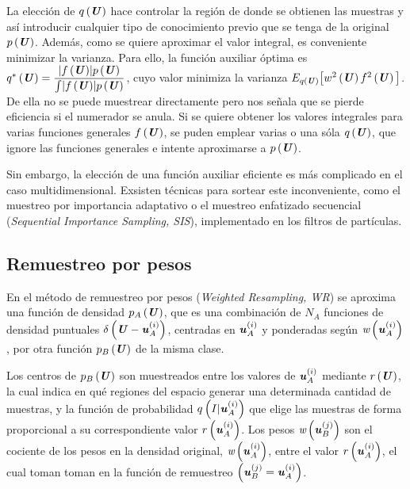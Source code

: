 La elección de $q\left(\textbf{\textit{U}}\right)$ hace controlar la región de donde se obtienen las muestras y así introducir cualquier tipo de conocimiento previo que se tenga de la original $p\left(\textbf{\textit{U}}\right)$. Además, como se quiere aproximar el valor integral, es conveniente minimizar la varianza. Para ello, la función auxiliar óptima es $q^*\left(\textbf{\textit{U}}\right) = \dfrac{\lvert f\left(\textbf{\textit{U}}\right)\rvert p\left(\textbf{\textit{U}}\right)}{\int \lvert f\left(\textbf{\textit{U}}\right)\rvert p\left(\textbf{\textit{U}}\right)}$, cuyo valor minimiza la varianza $E_{q\left(\textbf{\textit{U}}\right)}\big[w^2\left(\textbf{\textit{U}}\right) f^2\left(\textbf{\textit{U}}\right)\big]$. De ella no se puede muestrear directamente pero nos señala que se pierde eficiencia si el numerador se anula. Si se quiere obtener los valores integrales para varias funciones generales $f\left(\textbf{\textit{U}}\right)$, se puden emplear varias o una sóla $q\left(\textbf{\textit{U}}\right)$, que ignore las funciones generales e intente aproximarse a $p\left(\textbf{\textit{U}}\right)$.

Sin embargo, la elección de una función auxiliar eficiente es más complicado en el caso multidimensional. Exsisten técnicas para sortear este inconveniente, como el muestreo por importancia adaptativo o el muestreo enfatizado secuencial (\textit{Sequential Importance
Sampling, SIS}), implementado en los filtros de partículas.

\subsection{Remuestreo por pesos}\label{subsec:WR}
En el método de remuestreo por pesos (\textit{Weighted Resampling, WR}) se aproxima una función de densidad $p_{A}\left(\textbf{\textit{U}}\right)$, que es una combinación de $N_{A}$ funciones de densidad puntuales $\delta\left(\textbf{\textit{U}}-\textbf{\textit{u}}_{A}^{(i)}\right)$, centradas en $\textbf{\textit{u}}_{A}^{(i)}$ y ponderadas según $\textit{w}\left(\textbf{\textit{u}}_{A}^{(i)}\right)$, por otra función $p_{B}\left(\textbf{\textit{U}}\right)$ de la misma clase.

Los centros de $p_{B}\left(\textbf{\textit{U}}\right)$ son muestreados entre los valores de $\textbf{\textit{u}}_{A}^{(i)}$ mediante $r\left(\textbf{\textit{U}}\right)$, la cual indica en qué regiones del espacio generar una determinada cantidad de muestras, y la función de probabilidad $q\left(I|\textbf{\textit{u}}_{A}^{(i)}\right)$ que elige las muestras de forma proporcional a su correspondiente valor $r\left(\textbf{\textit{u}}_{A}^{(i)}\right)$. Los pesos $\textit{w}\left(\textbf{\textit{u}}_{B}^{(j)}\right)$ son el cociente de los pesos en la densidad original, $\textit{w}\left(\textbf{\textit{u}}_{A}^{(i)}\right)$, entre el valor $r\left(\textbf{\textit{u}}_{A}^{(i)}\right)$, el cual toman toman en la función de remuestreo $\left(\textbf{\textit{u}}_{B}^{(j)}= \textbf{\textit{u}}_{A}^{(i)}\right)$.

